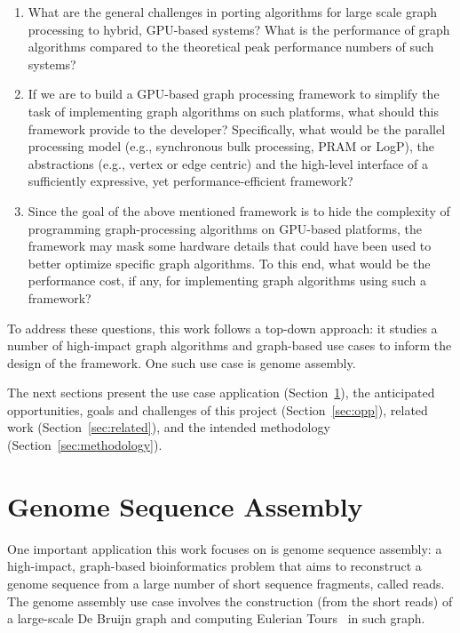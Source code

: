 \documentclass{acm_proc_article-sp}[12pt]
\begin{document}
\begin{enumerate}
  \item What are the general challenges in porting algorithms for
    large scale graph processing to hybrid, GPU-based systems? What is
    the performance of graph algorithms compared to the theoretical
    peak performance numbers of such systems? \\

  \item If we are to build a GPU-based graph processing framework to
    simplify the task of implementing graph algorithms on such
    platforms, what should this framework provide to the developer?
    Specifically, what would be the parallel processing model (e.g.,
    synchronous bulk processing, PRAM or LogP), the abstractions
    (e.g., vertex or edge centric) and the high-level interface of a
    sufficiently expressive, yet performance-efficient framework? 
  
  \item Since the goal of the above mentioned framework is to hide the
    complexity of programming graph-processing algorithms on GPU-based
    platforms, the framework may mask some hardware details that could
    have been used to better optimize specific graph algorithms. To
    this end, what would be the performance cost, if any, for
    implementing graph algorithms using such a framework? 
\end{enumerate}

To address these questions, this work follows a top-down approach: it
studies a number of high-impact graph algorithms and graph-based use
cases to inform the design of the framework. One such use case is
genome assembly.

The next sections present the use case application
(Section~\ref{sec:usecase}), the anticipated opportunities, goals and
challenges of this project (Section~\ref{sec:opp}), related work
(Section~\ref{sec:related}), and the intended methodology
(Section~\ref{sec:methodology}).

\section{Genome Sequence Assembly}
\label{sec:usecase}
One important application this work focuses on is genome sequence
assembly: a high-impact, graph-based bioinformatics problem that aims
to reconstruct a genome sequence from a large number of short sequence
fragments, called reads. The genome assembly use case involves the
construction (from the short reads) of a large-scale De Bruijn graph
and computing Eulerian Tours~\cite{pevzner2001eulerian,
  zerbino2008velvet} in such graph.
\end{document}
